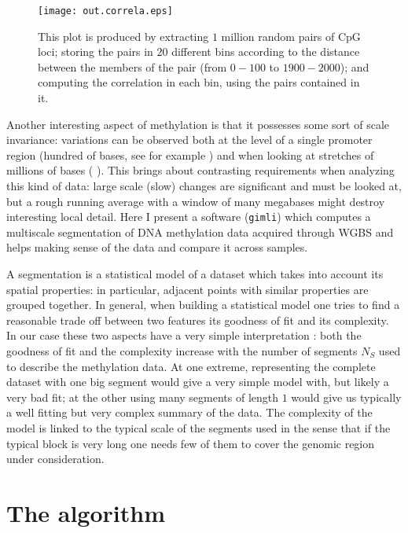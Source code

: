 \documentclass[12pt]{amsart}
\newcommand{\gimli}{\texttt{gimli}}
\begin{document}
\begin{center}
\begin{figure}\label{fig1}
\texttt{[image: out.correla.eps]}
\caption{This plot is produced by extracting $1$ million random pairs of CpG loci;
storing the pairs in $20$ different bins  according to the distance between the members
of the pair (from $0-100$ to $1900-2000$); and computing the correlation in each bin,
using the pairs contained in it.}
\end{figure}
\end{center}

Another interesting aspect of methylation is that it possesses some sort of scale 
invariance: variations can be observed both at the level of a single promoter
region (hundred of bases, see for example \cite{methylseekr}) and when looking at stretches
of millions of bases (\cite{largeblocks} ).
This brings about contrasting requirements when analyzing this kind of data: large scale (slow) changes are 
significant and must be looked at, but a rough
running average with a window of many megabases might destroy interesting
local detail. Here I present  a software (\gimli) which computes a multiscale segmentation 
of DNA methylation 
data acquired through WGBS and helps making sense of the data and compare 
it across samples.

A segmentation is a statistical model of a dataset  which takes into account its spatial properties:
in particular, adjacent points with similar properties are grouped together.
In general, when building a statistical model one tries to find a reasonable 
trade off between two 
features  its goodness of fit and its complexity.
In our case these two aspects have a very simple interpretation : both the goodness 
of fit and the complexity increase with the number of segments $N_S$ used to describe the 
methylation data.  
At one extreme, representing the complete dataset with one big segment would 
give a very simple model with, but likely a very bad fit;  
at the other using many segments of length $1$ would give us typically
a well fitting but very complex summary of the data.
The complexity of the model is linked to the typical scale of the segments used
in the sense that if the typical block is very long one needs few of them to 
cover the genomic region under consideration.

\section{The algorithm}
\end{document}
